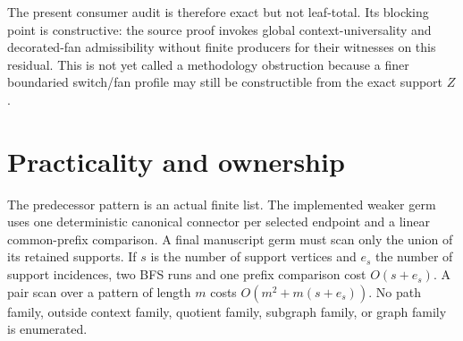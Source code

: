 \documentclass[11pt]{article}
\begin{document}
The present consumer audit is therefore exact but not leaf-total.  Its
blocking point is constructive: the source proof invokes global
context-universality and decorated-fan admissibility without finite producers
for their witnesses on this residual.  This is not yet called a methodology
obstruction because a finer boundaried switch/fan profile may still be
constructible from the exact support $Z$.

\section{Practicality and ownership}

The predecessor pattern is an actual finite list.  The implemented weaker
germ uses one deterministic canonical connector per selected endpoint and a
linear common-prefix comparison.  A final manuscript germ must scan only the
union of its retained supports.  If $s$ is the
number of support vertices and $e_s$ the number of support incidences, two
BFS runs and one prefix comparison cost $O(s+e_s)$.  A pair scan over a
pattern of length $m$ costs $O(m^2+m(s+e_s))$.  No path family, outside
context family, quotient family, subgraph family, or graph family is
enumerated.
\end{document}
